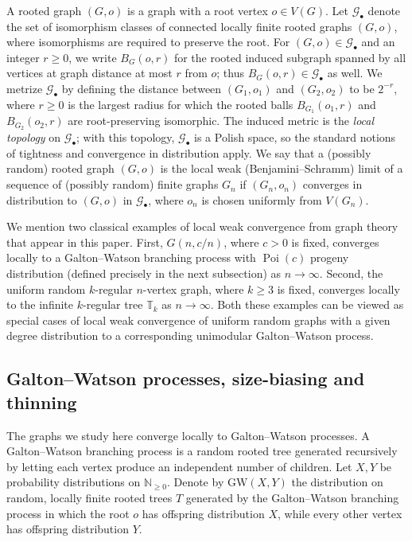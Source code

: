 \documentclass[reqno,english]{amsart}
\numberwithin{equation}{section}
\theoremstyle{definition}{
\newtheorem{example}[theorem]{Example}
\newtheorem{definition}[theorem]{Definition}
\newtheorem*{definition*}{Definition}
\newtheorem{problem}[theorem]{Problem}
\newtheorem{question}[theorem]{Question}
}
\newcommand{\N}{\mathbb N}
\newcommand{\bbT}{\mathbb T}
\newcommand{\cG}{\mathcal G}
\begin{document}
A rooted graph $(G,o)$ is a graph with a root vertex $o\in V(G)$. Let $\cG_\bullet$ denote the set of isomorphism classes of connected locally finite rooted graphs $(G,o)$, 
where isomorphisms are required to preserve the root. 
For $(G,o)\in\cG_\bullet$ and an integer $r\ge 0$, we write $B_G(o,r)$ for the rooted induced subgraph spanned by all vertices 
at graph distance at most $r$ from $o$; thus $B_G(o,r)\in\cG_\bullet$ as well. We metrize $\cG_\bullet$ by defining 
the distance between $(G_1,o_1)$ and $(G_2,o_2)$ to be $2^{-r}$, where $r\ge 0$ is the largest radius for which the 
rooted balls $B_{G_1}(o_1,r)$ and $B_{G_2}(o_2,r)$ are root-preserving isomorphic. The induced metric is the 
{\em local topology} on $\cG_\bullet$; with this topology, $\cG_\bullet$ is a Polish space, so the standard notions of tightness and convergence in distribution apply.
We say that a (possibly random) rooted graph $(G,o)$ is the local weak (Benjamini--Schramm) limit of a sequence of (possibly random) finite graphs $G_n$ if $(G_n,o_n)$ 
converges in distribution to $(G,o)$ in $\cG_\bullet$, where $o_n$ is chosen uniformly from $V(G_n)$.

We mention two classical examples of local weak convergence from graph theory that appear in this paper. First, $G(n,c/n)$, where $c>0$ is fixed, converges locally to a 
Galton--Watson branching process with $\operatorname{Poi}(c)$ progeny distribution (defined precisely in the next subsection) as $n\to\infty$. 
Second, the uniform random $k$-regular $n$-vertex graph, where $k\ge 3$ is fixed, converges locally to the infinite $k$-regular tree $\bbT_k$ as $n\to\infty$. 
Both these examples can be viewed as special cases of local weak convergence of uniform random graphs with a given degree distribution 
to a corresponding unimodular Galton--Watson process.

\subsection{Galton--Watson processes, size-biasing and thinning}
The graphs we study here converge locally to Galton--Watson processes. 
A Galton--Watson branching process is a random rooted tree generated recursively by letting each vertex produce an independent number of children.  
Let $X,Y$ be probability distributions on $\N_{\ge 0}$. Denote by $\mathrm{GW}(X,Y)$ the distribution on random, locally finite rooted trees $T$ generated 
by the Galton--Watson branching process in which the root $o$ has offspring distribution $X$, while every other vertex has offspring distribution $Y$. 
\end{document}
